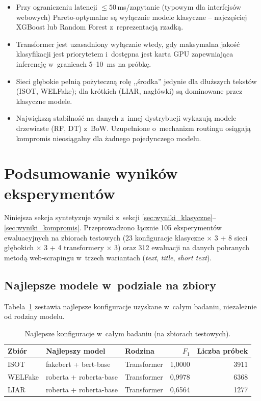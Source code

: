 \documentclass[oneside,polski,logo]{amuthesis}
\begin{document}
\begin{itemize}
  \item Przy ograniczeniu latencji $\le 50$\,ms/zapytanie (typowym
        dla interfejsów webowych) Pareto-optymalne są wyłącznie modele
        klasyczne -- najczęściej XGBoost lub Random Forest z~reprezentacją rzadką.
  \item Transformer jest uzasadniony wyłącznie wtedy, gdy maksymalna
        jakość klasyfikacji jest priorytetem i~dostępna jest karta GPU
        zapewniająca inferencję w~granicach 5--10~ms na próbkę.
  \item Sieci głębokie pełnią pożyteczną rolę ,,środka'' jedynie dla
        dłuższych tekstów (ISOT, WELFake); dla krótkich (LIAR, nagłówki)
        są dominowane przez klasyczne modele.
  \item Największą stabilność na danych z~innej dystrybucji wykazują
        modele drzewiaste (RF, DT) z~BoW. Uzupełnione o~mechanizm
        routingu osiągają kompromis nieosiągalny dla żadnego
        pojedynczego modelu.
\end{itemize}

\section{Podsumowanie wyników eksperymentów}
\label{sec:wyniki_podsumowanie}

Niniejsza sekcja syntetyzuje wyniki z~sekcji
\ref{sec:wyniki_klasyczne}--\ref{sec:wyniki_kompromis}.
Przeprowadzono łącznie 105 eksperymentów ewaluacyjnych na zbiorach
testowych (23 konfiguracje klasyczne $\times$ 3 + 8 sieci głębokich
$\times$ 3 + 4 transformery $\times$ 3) oraz 312 ewaluacji na danych
pobranych metodą web-scrapingu w~trzech wariantach
(\emph{text}, \emph{title}, \emph{short text}).

\subsection{Najlepsze modele w~podziale na zbiory}
\label{sec:podsum_best}

Tabela~\ref{tab:podsum_best} zestawia najlepsze konfiguracje
uzyskane w~całym badaniu, niezależnie od rodziny modelu.

\begin{table}[ht]
\centering
\caption{Najlepsze konfiguracje w~całym badaniu (na zbiorach
testowych).}
\label{tab:podsum_best}
\begin{tabular}{lllrr}
\toprule
Zbiór & Najlepszy model & Rodzina & $F_1$ & Liczba próbek \\
\midrule
ISOT    & fakebert + bert-base   & Transformer & 1,0000 & 3911 \\
WELFake & roberta + roberta-base & Transformer & 0,9978 & 6368 \\
LIAR    & roberta + roberta-base & Transformer & 0,6564 & 1277 \\
\bottomrule
\end{tabular}
\end{table}
\end{document}
